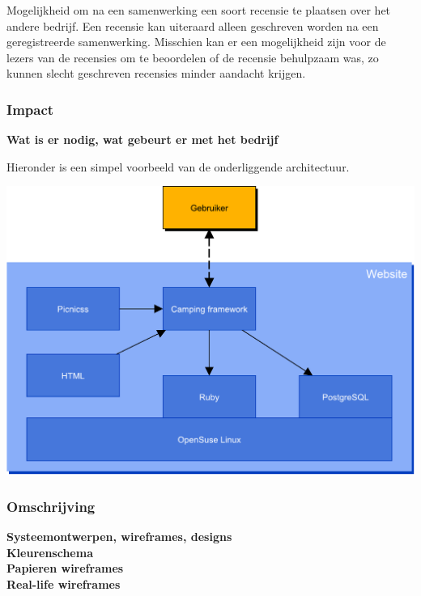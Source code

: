 Mogelijkheid om na een samenwerking een soort recensie te plaatsen
over het andere bedrijf. Een recensie kan uiteraard alleen geschreven
worden na een geregistreerde samenwerking. Misschien kan er een
mogelijkheid zijn voor de lezers van de recensies om te beoordelen of
de recensie behulpzaam was, zo kunnen slecht geschreven recensies
minder aandacht krijgen.

\subsubsection{Impact}
{\bf Wat is er nodig, wat gebeurt er met het bedrijf}

Hieronder is een simpel voorbeeld van de onderliggende architectuur.

\includegraphics[width=\textwidth]{img/websiteArchitecture}

\subsubsection{Omschrijving}

{\bf Systeemontwerpen, wireframes, designs} \\

{\bf Kleurenschema} \\


{\bf Papieren wireframes} \\

{\bf Real-life wireframes} \\



